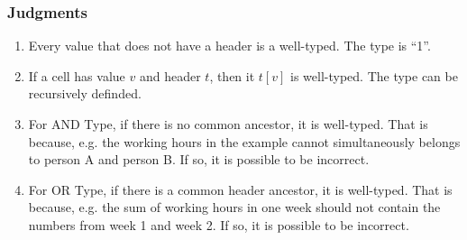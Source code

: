 \documentclass[a4paper]{article}
\begin{document}
\subsubsection{Judgments}
\begin{enumerate}
\item Every value that does not have a header is a well-typed. The type is ``1''.
\item If a cell has value $v$ and header $t$, then it $t[v]$ is well-typed. The type can be recursively definded.
\item For AND Type, if there is no common ancestor, it is well-typed. That is because, e.g. the working hours in the example cannot simultaneously belongs to person A and person B. If so, it is possible to be incorrect.
\item For OR Type, if there is a common header ancestor, it is well-typed. That is because, e.g. the sum of working hours in one week should not contain the numbers from week 1 and week 2. If so, it is possible to be incorrect.
\end{enumerate}
\end{document}
